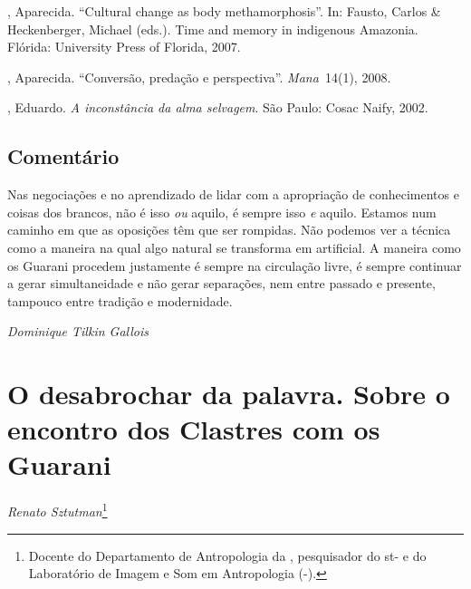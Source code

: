 {{\begin{Parskip}
, Aparecida. ``Cultural change as body methamorphosis''. In: Fausto,
Carlos \& Heckenberger, Michael (eds.). Time and memory in indigenous
Amazonia. Flórida: University Press of Florida, 2007.

, Aparecida. ``Conversão, predação e perspectiva''. \emph{Mana~}14(1), 2008.

  , Eduardo. \emph{A inconstância da alma selvagem}. São Paulo:
Cosac Naify, 2002.
\end{Parskip}

\section{Comentário}
Nas negociações e no aprendizado de lidar com a apropriação de
conhecimentos e coisas dos brancos, não é isso \emph{ou} aquilo, é sempre isso
\emph{e} aquilo. Estamos num caminho em que as oposições têm que ser rompidas.
Não podemos ver a técnica como a maneira na qual algo natural se
transforma em artificial. A maneira como os Guarani procedem justamente
é sempre na circulação livre, é sempre continuar a gerar simultaneidade
e não gerar separações, nem entre passado e presente, tampouco entre
tradição e modernidade.
\medskip
\begin{flushright}
\emph{Dominique Tilkin Gallois}
\end{flushright}

\chapter{O desabrochar da palavra. Sobre o encontro dos Clastres com os
Guarani}
\begin{flushright}
\emph{Renato Sztutman}\footnote{Docente do Departamento de Antropologia da ,
pesquisador do st- e do Laboratório de Imagem e Som em
Antropologia (-).}
\end{flushright}
\medskip

}}
